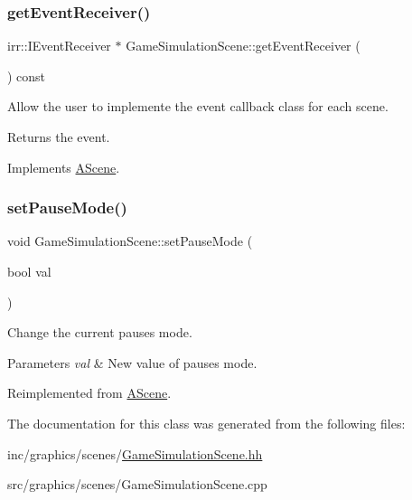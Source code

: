 \subsubsection{\texorpdfstring{get\+Event\+Receiver()}{getEventReceiver()}}
{\footnotesize\ttfamily irr\+::\+I\+Event\+Receiver $\ast$ Game\+Simulation\+Scene\+::get\+Event\+Receiver (\begin{DoxyParamCaption}{ }\end{DoxyParamCaption}) const\hspace{0.3cm}{\ttfamily [virtual]}}



Allow the user to implemente the event callback class for each scene. 

\begin{DoxyReturn}{Returns}
the event. 
\end{DoxyReturn}


Implements \hyperlink{classAScene_af521e5e6d30a5d2e5d30eb333e4d3abd}{A\+Scene}.

\mbox{\label{classGameSimulationScene_a34377bab69b7a81e50f3d2c42596c574}} 
\subsubsection{\texorpdfstring{set\+Pause\+Mode()}{setPauseMode()}}
{\footnotesize\ttfamily void Game\+Simulation\+Scene\+::set\+Pause\+Mode (\begin{DoxyParamCaption}\item[{bool}]{val }\end{DoxyParamCaption})\hspace{0.3cm}{\ttfamily [virtual]}}



Change the current pause\textquotesingle{}s mode. 


\begin{DoxyParams}{Parameters}
{\em val} & New value of pause\textquotesingle{}s mode. \\
\hline
\end{DoxyParams}


Reimplemented from \hyperlink{classAScene_a7ff45d7a24796f52d815c00770900339}{A\+Scene}.



The documentation for this class was generated from the following files\+:\begin{DoxyCompactItemize}
\item 
inc/graphics/scenes/\hyperlink{GameSimulationScene_8hh}{Game\+Simulation\+Scene.\+hh}\item 
src/graphics/scenes/Game\+Simulation\+Scene.\+cpp\end{DoxyCompactItemize}
